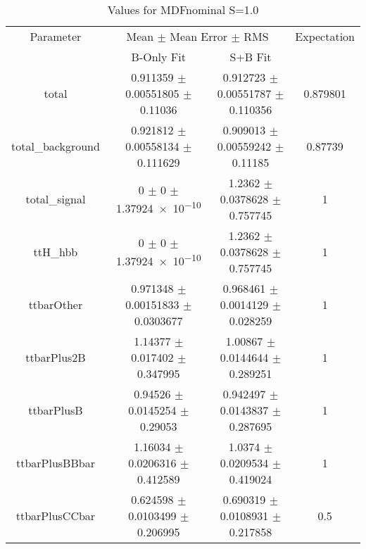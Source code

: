 \begin{table}
\centering
\caption{Values for MDFnominal S=1.0}
\begin{tabular}{cccc}
\toprule
Parameter & \multicolumn{2}{c}{Mean $\pm$ Mean Error $\pm$ RMS} & Expectation\\
 & B-Only Fit & S+B Fit & \\
\midrule
total & \num{0.911359} $\pm$ \num{0.00551805} $\pm$ \num{0.11036} & \num{0.912723} $\pm$ \num{0.00551787} $\pm$ \num{0.110356} & \num{0.879801}\\
total\_background & \num{0.921812} $\pm$ \num{0.00558134} $\pm$ \num{0.111629} & \num{0.909013} $\pm$ \num{0.00559242} $\pm$ \num{0.11185} & \num{0.87739}\\
total\_signal & \num{0} $\pm$ \num{0} $\pm$ \num{1.37924e-10} & \num{1.2362} $\pm$ \num{0.0378628} $\pm$ \num{0.757745} & \num{1}\\
ttH\_hbb & \num{0} $\pm$ \num{0} $\pm$ \num{1.37924e-10} & \num{1.2362} $\pm$ \num{0.0378628} $\pm$ \num{0.757745} & \num{1}\\
ttbarOther & \num{0.971348} $\pm$ \num{0.00151833} $\pm$ \num{0.0303677} & \num{0.968461} $\pm$ \num{0.0014129} $\pm$ \num{0.028259} & \num{1}\\
ttbarPlus2B & \num{1.14377} $\pm$ \num{0.017402} $\pm$ \num{0.347995} & \num{1.00867} $\pm$ \num{0.0144644} $\pm$ \num{0.289251} & \num{1}\\
ttbarPlusB & \num{0.94526} $\pm$ \num{0.0145254} $\pm$ \num{0.29053} & \num{0.942497} $\pm$ \num{0.0143837} $\pm$ \num{0.287695} & \num{1}\\
ttbarPlusBBbar & \num{1.16034} $\pm$ \num{0.0206316} $\pm$ \num{0.412589} & \num{1.0374} $\pm$ \num{0.0209534} $\pm$ \num{0.419024} & \num{1}\\
ttbarPlusCCbar & \num{0.624598} $\pm$ \num{0.0103499} $\pm$ \num{0.206995} & \num{0.690319} $\pm$ \num{0.0108931} $\pm$ \num{0.217858} & \num{0.5}\\
\bottomrule
\end{tabular}
\end{table}
